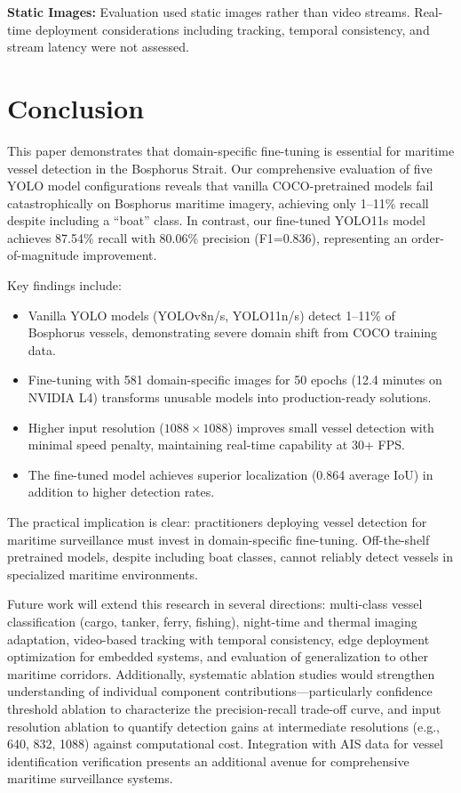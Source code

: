 \documentclass[pdflatex,sn-mathphys-num,Numbered]{sn-jnl}
\begin{document}
\textbf{Static Images:} Evaluation used static images rather than video streams. Real-time deployment considerations including tracking, temporal consistency, and stream latency were not assessed.

\section{Conclusion}\label{sec:conclusion}

This paper demonstrates that domain-specific fine-tuning is essential for maritime vessel detection in the Bosphorus Strait. Our comprehensive evaluation of five YOLO model configurations reveals that vanilla COCO-pretrained models fail catastrophically on Bosphorus maritime imagery, achieving only 1--11\% recall despite including a ``boat'' class. In contrast, our fine-tuned YOLO11s model achieves 87.54\% recall with 80.06\% precision (F1=0.836), representing an order-of-magnitude improvement.

Key findings include:
\begin{itemize}
    \item Vanilla YOLO models (YOLOv8n/s, YOLO11n/s) detect 1--11\% of Bosphorus vessels, demonstrating severe domain shift from COCO training data.
    \item Fine-tuning with 581 domain-specific images for 50 epochs (12.4 minutes on NVIDIA L4) transforms unusable models into production-ready solutions.
    \item Higher input resolution ($1088 \times 1088$) improves small vessel detection with minimal speed penalty, maintaining real-time capability at 30+ FPS.
    \item The fine-tuned model achieves superior localization (0.864 average IoU) in addition to higher detection rates.
\end{itemize}

The practical implication is clear: practitioners deploying vessel detection for maritime surveillance must invest in domain-specific fine-tuning. Off-the-shelf pretrained models, despite including boat classes, cannot reliably detect vessels in specialized maritime environments.

Future work will extend this research in several directions: multi-class vessel classification (cargo, tanker, ferry, fishing), night-time and thermal imaging adaptation, video-based tracking with temporal consistency, edge deployment optimization for embedded systems, and evaluation of generalization to other maritime corridors. Additionally, systematic ablation studies would strengthen understanding of individual component contributions---particularly confidence threshold ablation to characterize the precision-recall trade-off curve, and input resolution ablation to quantify detection gains at intermediate resolutions (e.g., 640, 832, 1088) against computational cost. Integration with AIS data for vessel identification verification presents an additional avenue for comprehensive maritime surveillance systems.
\end{document}
